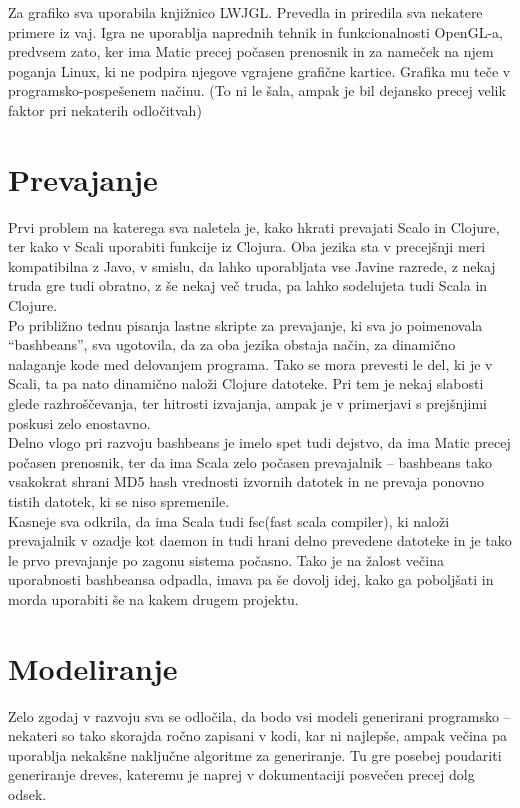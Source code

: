 \documentclass[10pt,a4paper,oneside]{book}
\def\pa{\\[-6pt]}
\begin{document}
Za grafiko sva uporabila knjižnico LWJGL. Prevedla in priredila sva
nekatere primere iz vaj. Igra ne uporablja naprednih tehnik in
funkcionalnosti OpenGL-a, predvsem zato, ker ima Matic precej počasen
prenosnik in za nameček na njem poganja Linux, ki ne podpira njegove
vgrajene grafične kartice. Grafika mu teče v programsko-pospešenem
načinu. (To ni le šala, ampak je bil dejansko precej velik faktor pri nekaterih
odločitvah)

\section{Prevajanje}
Prvi problem na katerega sva naletela je, kako hkrati prevajati Scalo in Clojure, ter kako v Scali uporabiti funkcije iz Clojura. Oba jezika sta v precejšnji meri kompatibilna z Javo, v smislu, da lahko uporabljata vse Javine razrede, z nekaj truda gre tudi obratno, z še nekaj več truda, pa lahko sodelujeta tudi Scala in Clojure.\pa

Po približno tednu pisanja lastne skripte za prevajanje, ki sva jo poimenovala ``bashbeans'', sva ugotovila, da za oba jezika obstaja način, za dinamično nalaganje kode med delovanjem programa. Tako se mora prevesti le del, ki je v Scali, ta pa nato dinamično naloži Clojure datoteke. Pri tem je nekaj slabosti glede razhroščevanja, ter hitrosti izvajanja, ampak je v primerjavi s prejšnjimi poskusi zelo enostavno.\pa

Delno vlogo pri razvoju bashbeans je imelo spet tudi dejstvo, da ima Matic precej počasen prenosnik, ter da ima Scala zelo počasen prevajalnik -- bashbeans tako vsakokrat shrani MD5 hash vrednosti izvornih datotek in ne prevaja ponovno tistih datotek, ki se niso spremenile.\pa

Kasneje sva odkrila, da ima Scala tudi fsc(fast scala compiler), ki naloži prevajalnik v ozadje kot daemon in tudi hrani delno prevedene datoteke in je tako le prvo prevajanje po zagonu sistema počasno. Tako je na žalost večina uporabnosti bashbeansa odpadla, imava pa še dovolj idej, kako ga poboljšati in morda uporabiti še na kakem drugem projektu.

\section{Modeliranje}
Zelo zgodaj v razvoju sva se odločila, da bodo vsi modeli generirani programsko -- nekateri so tako skorajda ročno zapisani v kodi, kar ni najlepše, ampak večina pa uporablja nekakšne naključne algoritme za generiranje. Tu gre posebej poudariti generiranje dreves, kateremu je naprej v dokumentaciji posvečen precej dolg odsek.\pa
\end{document}
